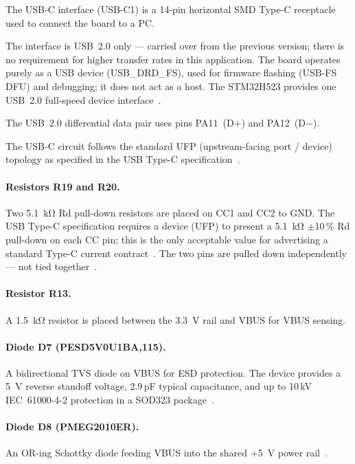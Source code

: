 The USB-C interface (USB-C1) is a 14-pin horizontal SMD Type-C receptacle used to connect
the board to a PC.

The interface is USB~2.0 only --- carried over from the previous version; there is no
requirement for higher transfer rates in this application. The board operates purely as a
USB device (USB\_DRD\_FS), used for firmware flashing (USB-FS DFU) and debugging; it does
not act as a host. The STM32H523 provides one USB~2.0 full-speed device
interface~\cite{ref1}.

The USB~2.0 differential data pair uses pins PA11~(D+) and PA12~(D$-$).

The USB-C circuit follows the standard UFP (upstream-facing port / device) topology as
specified in the USB Type-C specification~\cite{ref22,ref23}.

\paragraph{Resistors R19 and R20.}
Two \SI{5.1}{\kilo\ohm} Rd pull-down resistors are placed on CC1 and CC2 to GND. The
USB Type-C specification requires a device (UFP) to present a \SI{5.1}{\kilo\ohm}
$\pm$10\,\% Rd pull-down on each CC pin; this is the only acceptable value for
advertising a standard Type-C current contract~\cite{ref22,ref23}. The two pins are
pulled down independently --- not tied together~\cite{ref23}.

\paragraph{Resistor R13.}
A \SI{1.5}{\kilo\ohm} resistor is placed between the \SI{3.3}{\volt} rail and VBUS for
VBUS sensing.

\paragraph{Diode D7 (PESD5V0U1BA,115).}
A bidirectional TVS diode on VBUS for ESD protection. The device provides a \SI{5}{\volt}
reverse standoff voltage, 2.9\,pF typical capacitance, and up to 10\,kV IEC~61000-4-2
protection in a SOD323 package~\cite{ref10}.

\paragraph{Diode D8 (PMEG2010ER).}
An OR-ing Schottky diode feeding VBUS into the shared +\SI{5}{\volt} power
rail~\cite{ref9}.

